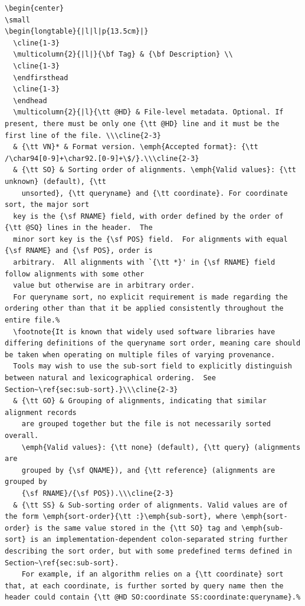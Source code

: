 \begin{verbatim}
\begin{center}
\small
\begin{longtable}{|l|l|p{13.5cm}|}
  \cline{1-3}
  \multicolumn{2}{|l|}{\bf Tag} & {\bf Description} \\
  \cline{1-3}
  \endfirsthead
  \cline{1-3}
  \endhead
  \multicolumn{2}{|l}{\tt @HD} & File-level metadata. Optional. If present, there must be only one {\tt @HD} line and it must be the first line of the file. \\\cline{2-3}
  & {\tt VN}* & Format version. \emph{Accepted format}: {\tt /\char94[0-9]+\char92.[0-9]+\$/}.\\\cline{2-3}
  & {\tt SO} & Sorting order of alignments. \emph{Valid values}: {\tt unknown} (default), {\tt
    unsorted}, {\tt queryname} and {\tt coordinate}. For coordinate sort, the major sort
  key is the {\sf RNAME} field, with order defined by the order of {\tt @SQ} lines in the header.  The
  minor sort key is the {\sf POS} field.  For alignments with equal {\sf RNAME} and {\sf POS}, order is
  arbitrary.  All alignments with `{\tt *}' in {\sf RNAME} field follow alignments with some other
  value but otherwise are in arbitrary order.
  For queryname sort, no explicit requirement is made regarding the ordering other than that it be applied consistently throughout the entire file.%
  \footnote{It is known that widely used software libraries have differing definitions of the queryname sort order, meaning care should be taken when operating on multiple files of varying provenance.
  Tools may wish to use the sub-sort field to explicitly distinguish between natural and lexicographical ordering.  See Section~\ref{sec:sub-sort}.}\\\cline{2-3}
  & {\tt GO} & Grouping of alignments, indicating that similar alignment records
    are grouped together but the file is not necessarily sorted overall.
    \emph{Valid values}: {\tt none} (default), {\tt query} (alignments are
    grouped by {\sf QNAME}), and {\tt reference} (alignments are grouped by
    {\sf RNAME}/{\sf POS}).\\\cline{2-3}
  & {\tt SS} & Sub-sorting order of alignments. Valid values are of the form \emph{sort-order}{\tt :}\emph{sub-sort}, where \emph{sort-order} is the same value stored in the {\tt SO} tag and \emph{sub-sort} is an implementation-dependent colon-separated string further describing the sort order, but with some predefined terms defined in Section~\ref{sec:sub-sort}.
    For example, if an algorithm relies on a {\tt coordinate} sort that, at each coordinate, is further sorted by query name then the header could contain {\tt @HD SO:coordinate SS:coordinate:queryname}.%

\end{verbatim}
